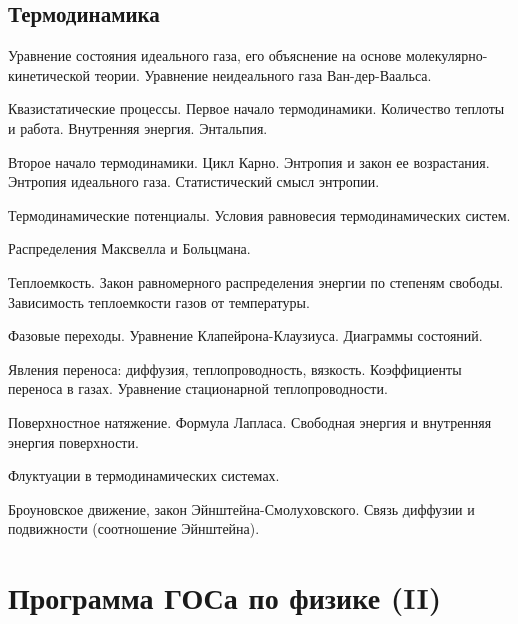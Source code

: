 \subsection*{Термодинамика}
\begin{enumerate*}
\setcounter{enumi}{9}
\item Уравнение состояния идеального газа, его объяснение на основе молекулярно-кинетической теории. Уравнение неидеального газа Ван-дер-Ваальса.
\item Квазистатические процессы. Первое начало термодинамики. Количество теплоты и работа. Внутренняя энергия. Энтальпия.
\item Второе начало термодинамики. Цикл Карно. Энтропия и закон ее возрастания. Энтропия идеального газа. Статистический смысл энтропии.
\item Термодинамические потенциалы. Условия равновесия термодинамических систем.
\item Распределения Максвелла и Больцмана.
\item Теплоемкость. Закон равномерного распределения энергии по степеням свободы. Зависимость теплоемкости газов от температуры.
\item Фазовые переходы. Уравнение Клапейрона-Клаузиуса. Диаграммы состояний.
\item Явления переноса: диффузия, теплопроводность, вязкость. Коэффициенты переноса в газах. Уравнение стационарной теплопроводности.
\item Поверхностное натяжение. Формула Лапласа. Свободная энергия и внутренняя энергия поверхности.
\item Флуктуации в термодинамических системах.
\item Броуновское движение, закон Эйнштейна-Смолуховского. Связь диффузии и подвижности (соотношение Эйнштейна).
\end{enumerate*}

\newpage

\section*{Программа ГОСа по физике (II)}

